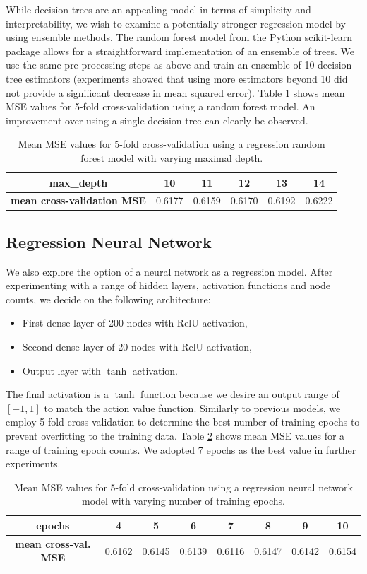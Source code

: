 \documentclass{sfuthesis}
\begin{document}
	While decision trees are an appealing model in terms of simplicity and interpretability, we wish to examine a potentially stronger regression model by using ensemble methods. The random forest model from the Python scikit-learn package allows for a straightforward implementation of an ensemble of trees. We use the same pre-processing steps as above and train an ensemble of 10 decision tree estimators (experiments showed that using more estimators beyond 10 did not provide a significant decrease in mean squared error). Table \ref{tab:forest-mse} shows mean MSE values for 5-fold cross-validation using a random forest model. An improvement over using a single decision tree can clearly be observed.\\
	\begin{table}[ht]
		\centering
		\begin{tabular}{c|ccccc}
			\textbf{max\_depth}                & 10      & 11      & 12     & 13     & 14       \\ \hline
			\textbf{mean cross-validation MSE} & 0.6177 & 0.6159 & 0.6170 & 0.6192 & 0.6222
		\end{tabular}
		\caption{Mean MSE values for 5-fold cross-validation using a regression random forest model with varying maximal depth.}
		\label{tab:forest-mse}
	\end{table}
	
	\subsection{Regression Neural Network}
	
	We also explore the option of a neural network as a regression model. After experimenting with a range of hidden layers, activation functions and node counts, we decide on the following architecture:
	\begin{itemize}
		\item First dense layer of 200 nodes with RelU activation,
		\item Second dense layer of 20 nodes with RelU activation,
		\item Output layer with $\tanh$ activation.
	\end{itemize}
	The final activation is a $\tanh$ function because we desire an output range of $[-1,1]$ to match the action value function. Similarly to previous models, we employ 5-fold cross validation to determine the best number of training epochs to prevent overfitting to the training data. Table \ref{tab:nn-mse} shows mean MSE values for a range of training epoch counts. We adopted 7 epochs as the best value in further experiments.
	\begin{table}[ht]
		\centering
		\begin{tabular}{c|ccccccc}
			\textbf{epochs} & 4 & 5 & 6 & 7 & 8 & 9 & 10 \\ \hline
			\textbf{mean cross-val. MSE} & 0.6162 & 0.6145 & 0.6139 & 0.6116 & 0.6147 & 0.6142 & 0.6154
		\end{tabular}
		\caption{Mean MSE values for 5-fold cross-validation using a regression neural network model with varying number of training epochs.}
		\label{tab:nn-mse}
	\end{table}
	
\end{document}
